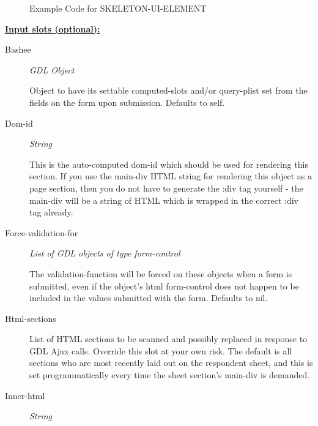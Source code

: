 \documentclass [11pt]{book}
\begin{document}
\begin{itemize}
\begin{figure}
\caption{Example Code for SKELETON-UI-ELEMENT}

\label{fig:example-code-SKELETON-UI-ELEMENT}

\end{figure}





\textbf{
\underline{Input slots (optional):}}

\begin{description}

\item [Bashee]
\emph{GDL Object}

 Object to have its settable computed-slots and/or query-plist set
from the fields on the form upon submission. Defaults to self.




\item [Dom-id]
\emph{String}

 This is the auto-computed dom-id which should be used for rendering
this section. If you use the main-div HTML string for rendering this object as a
page section, then you do not have to generate the :div tag yourself - the main-div
will be a string of HTML which is wrapped in the correct :div tag already.




\item [Force-validation-for]
\emph{List of GDL objects of type form-control}

 The validation-function will be forced
on these objects when a form is submitted, even if the object's html form-control does
not happen to be included in the values submitted with the form. Defaults to nil.




\item [Html-sections]

List of HTML sections to be scanned and possibly replaced in response to
GDL Ajax calls. Override this slot at your own risk. The default is all
sections who are most recently laid out on the respondent sheet, and
this is set programmatically every time the sheet section's main-div
is demanded.




\item [Inner-html]
\emph{String}


\end{description}
\end{itemize}
\end{document}
